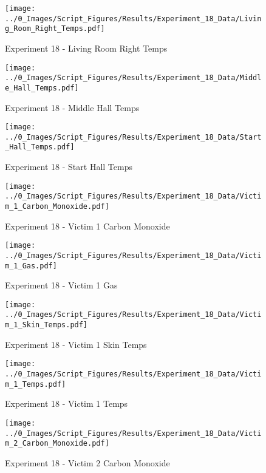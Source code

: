 	\begin{figure}[H]
		\centering
		\texttt{[image: ../0\_Images/Script\_Figures/Results/Experiment\_18\_Data/Living\_Room\_Right\_Temps.pdf]}
		\caption[]{Experiment 18 - Living Room Right Temps}
	\end{figure}
 
	\clearpage

	\begin{figure}[H]
		\centering
		\texttt{[image: ../0\_Images/Script\_Figures/Results/Experiment\_18\_Data/Middle\_Hall\_Temps.pdf]}
		\caption[]{Experiment 18 - Middle Hall Temps}
	\end{figure}
 

	\begin{figure}[H]
		\centering
		\texttt{[image: ../0\_Images/Script\_Figures/Results/Experiment\_18\_Data/Start\_Hall\_Temps.pdf]}
		\caption[]{Experiment 18 - Start Hall Temps}
	\end{figure}
 
	\clearpage

	\begin{figure}[H]
		\centering
		\texttt{[image: ../0\_Images/Script\_Figures/Results/Experiment\_18\_Data/Victim\_1\_Carbon\_Monoxide.pdf]}
		\caption[]{Experiment 18 - Victim 1 Carbon Monoxide}
	\end{figure}
 

	\begin{figure}[H]
		\centering
		\texttt{[image: ../0\_Images/Script\_Figures/Results/Experiment\_18\_Data/Victim\_1\_Gas.pdf]}
		\caption[]{Experiment 18 - Victim 1 Gas}
	\end{figure}
 
	\clearpage

	\begin{figure}[H]
		\centering
		\texttt{[image: ../0\_Images/Script\_Figures/Results/Experiment\_18\_Data/Victim\_1\_Skin\_Temps.pdf]}
		\caption[]{Experiment 18 - Victim 1 Skin Temps}
	\end{figure}
 

	\begin{figure}[H]
		\centering
		\texttt{[image: ../0\_Images/Script\_Figures/Results/Experiment\_18\_Data/Victim\_1\_Temps.pdf]}
		\caption[]{Experiment 18 - Victim 1 Temps}
	\end{figure}
 
	\clearpage

	\begin{figure}[H]
		\centering
		\texttt{[image: ../0\_Images/Script\_Figures/Results/Experiment\_18\_Data/Victim\_2\_Carbon\_Monoxide.pdf]}
		\caption[]{Experiment 18 - Victim 2 Carbon Monoxide}
	\end{figure}
 

